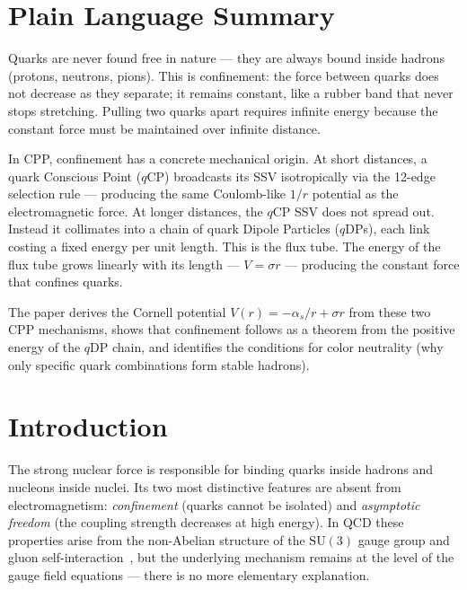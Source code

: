 \documentclass[12pt]{article}
\newcommand{\qCP}{q\mathrm{CP}}
\newcommand{\qDP}{q\mathrm{DP}}
\newcommand{\as}{\alpha_s}
\begin{document}
\section*{Plain Language Summary}

Quarks are never found free in nature — they are always bound inside
hadrons (protons, neutrons, pions). This is confinement: the force
between quarks does not decrease as they separate; it remains constant,
like a rubber band that never stops stretching. Pulling two quarks apart
requires infinite energy because the constant force must be maintained
over infinite distance.

In CPP, confinement has a concrete mechanical origin. At short
distances, a quark Conscious Point ($\qCP$) broadcasts its SSV
isotropically via the 12-edge selection rule — producing the same
Coulomb-like $1/r$ potential as the electromagnetic force. At longer
distances, the $\qCP$ SSV does not spread out. Instead it
collimates into a chain of quark Dipole Particles ($\qDP$s), each
link costing a fixed energy per unit length. This is the flux tube.
The energy of the flux tube grows linearly with its length — $V = \sigma r$
— producing the constant force that confines quarks.

The paper derives the Cornell potential $V(r) = -\as/r + \sigma r$ from
these two CPP mechanisms, shows that confinement follows as a theorem
from the positive energy of the $\qDP$ chain, and identifies the
conditions for color neutrality (why only specific quark combinations
form stable hadrons).

\section{Introduction}
\label{sec:intro}

The strong nuclear force is responsible for binding quarks inside
hadrons and nucleons inside nuclei. Its two most distinctive features
are absent from electromagnetism: \emph{confinement} (quarks cannot
be isolated) and \emph{asymptotic freedom} (the coupling strength
decreases at high energy). In QCD these properties arise from the
non-Abelian structure of the $\mathrm{SU}(3)$ gauge group and gluon
self-interaction~\cite{gross1973,politzer1973}, but the underlying
mechanism remains at the level of the gauge field equations — there
is no more elementary explanation.
\end{document}
